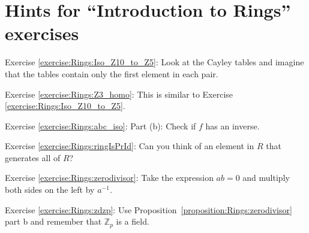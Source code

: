\section{Hints for ``Introduction to Rings'' exercises}
\label{sec:Rings:Hints} 

\noindent Exercise \ref{exercise:Rings:Iso_Z10_to_Z5}:  Look at the Cayley tables and imagine that the tables contain only the first element in each pair.

\noindent Exercise \ref{exercise:Rings:Z3_homo}: 
This is similar to Exercise \ref{exercise:Rings:Iso_Z10_to_Z5}.

\noindent Exercise \ref{exercise:Rings:abc_iso}:
Part (b):  Check if $f$ has an inverse.

\noindent Exercise \ref{exercise:Rings:ringIsPrId}:
Can you think of an element in $R$ that generates all of $R$?

\noindent Exercise \ref{exercise:Rings:zerodivisor}:  Take the expression $ab=0$ and multiply both sides on the left by $a^{-1}$.

\noindent Exercise \ref{exercise:Rings:zdzp}:  Use Proposition~\ref{proposition:Rings:zerodivisor} part b and remember that $\mathbb{Z}_p$ is a field.
